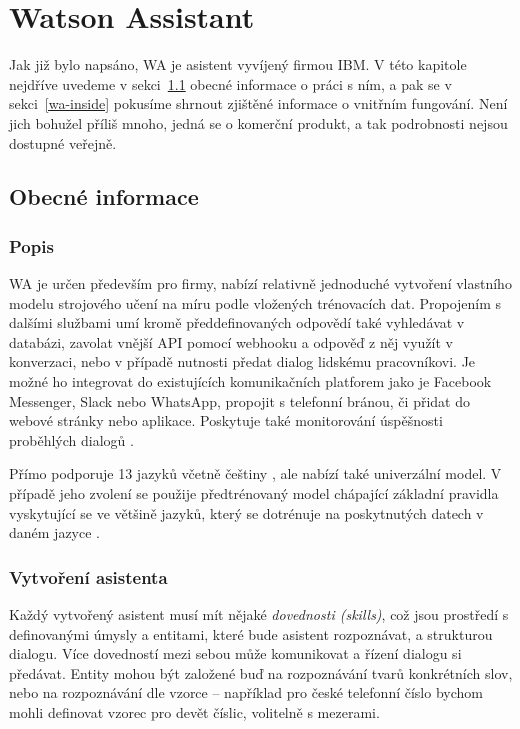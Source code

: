 \chapter{Watson Assistant}

Jak již bylo napsáno, WA je asistent vyvíjený firmou IBM.
V této kapitole nejdříve uvedeme v sekci~\ref{wa-common} obecné informace
o práci s ním, a pak se v sekci~\ref{wa-inside} pokusíme shrnout zjištěné
informace o vnitřním fungování.
Není jich bohužel příliš mnoho, jedná se o komerční produkt,
a tak podrobnosti nejsou dostupné veřejně.

\section{Obecné informace}\label{wa-common}

\subsection{Popis}

WA je určen především pro firmy, nabízí relativně jednoduché vytvoření
vlastního modelu strojového učení na míru podle vložených trénovacích
dat. Propojením s dalšími službami umí kromě předdefinovaných odpovědí
také vyhledávat v databázi, zavolat vnější API pomocí webhooku a odpověď
z něj využít v konverzaci, nebo v případě nutnosti předat dialog lidskému
pracovníkovi. Je možné ho integrovat do existujících komunikačních platforem
jako je Facebook Messenger, Slack nebo WhatsApp, propojit s telefonní
bránou, či přidat do webové stránky nebo aplikace. Poskytuje také monitorování
úspěšnosti proběhlých dialogů \citep{wa_about}.

Přímo podporuje 13 jazyků včetně
češtiny \citep{wa_languages}, ale nabízí také univerzální model. V případě
jeho zvolení se použije předtrénovaný model chápající základní pravidla
vyskytující se ve většině jazyků, který se dotrénuje na poskytnutých
datech v daném jazyce \citep{wa_universal_model}.

\subsection{Vytvoření asistenta}

Každý vytvořený asistent musí mít nějaké \textit{dovednosti (skills)},
což jsou prostředí s definovanými úmysly a entitami, které bude asistent
rozpoznávat, a strukturou dialogu. Více dovedností mezi sebou může komunikovat
a řízení dialogu si předávat. Entity mohou být založené buď na rozpoznávání tvarů
konkrétních slov, nebo na rozpoznávání dle vzorce -- například pro české telefonní
číslo bychom mohli definovat vzorec pro devět číslic, volitelně s mezerami.

